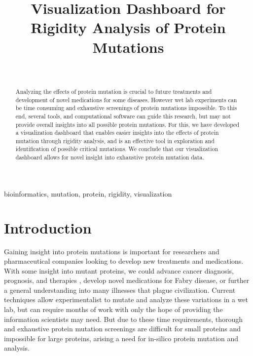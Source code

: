 \documentclass[10pt]{IEEEtran}
\begin{document}
\title{Visualization Dashboard for Rigidity Analysis of Protein Mutations}

\author{\\
}

\maketitle

\begin{abstract}
Analyzing the effects of protein mutation is crucial to future treatments and development of novel medications for some diseases. However wet lab experiments can be time consuming and exhaustive screenings of protein mutations impossible. To this end, several tools, and computational software can guide this research, but may not provide overall insights into all possible protein mutations. For this, we have developed a visualization dashboard that enables easier insights into the effects of protein mutation through rigidity analysis, and is an effective tool in exploration and identification of possible critical mutations. We conclude that our visualization dashboard allows for novel insight into exhaustive protein mutation data.\\
\end{abstract}

\begin{IEEEkeywords}
bioinformatics, mutation, protein, rigidity, visualization
\end{IEEEkeywords}

\section{Introduction}
Gaining insight into protein mutations is important for researchers and pharmaceutical companies looking to develop new treatments and medications. With some insight into mutant proteins, we could advance cancer diagnosis, prognosis, and therapies \cite{b2}, develop novel medications for Fabry disease, or further a general understanding into many illnesses that plague civilization. Current techniques allow experimentalist to mutate and analyze these variations in a wet lab, but can require months of work with only the hope of providing the information scientists may need\cite{b3}. But due to these time requirements, thorough and exhaustive protein mutation screenings are difficult for small proteins and impossible for large proteins, arising a need for in-silico protein mutation and analysis.\\
\end{document}
